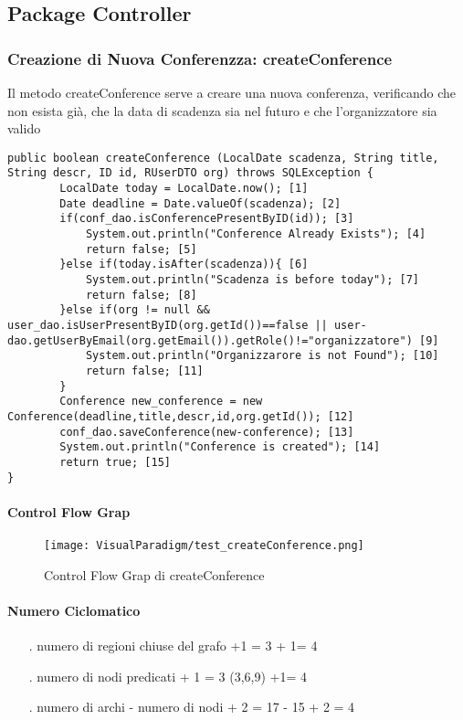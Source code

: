 \subsection{Package Controller}
\label{sec:test_strutturale_package_controller}

\subsubsection{Creazione di Nuova Conferenzza: createConference}
Il metodo createConference serve a creare una nuova conferenza, verificando che non esista già, che la data di scadenza sia nel futuro e che l'organizzatore sia valido
\begin{lstlisting}
public boolean createConference (LocalDate scadenza, String title, String descr, ID id, RUserDTO org) throws SQLException { 
        LocalDate today = LocalDate.now(); [1]
        Date deadline = Date.valueOf(scadenza); [2]
        if(conf_dao.isConferencePresentByID(id)); [3]
            System.out.println("Conference Already Exists"); [4]
            return false; [5]
        }else if(today.isAfter(scadenza)){ [6]
            System.out.println("Scadenza is before today"); [7]
            return false; [8]
        }else if(org != null && user_dao.isUserPresentByID(org.getId())==false || user-dao.getUserByEmail(org.getEmail()).getRole()!="organizzatore") [9]
            System.out.println("Organizzarore is not Found"); [10]
            return false; [11]
        }
        Conference new_conference = new Conference(deadline,title,descr,id,org.getId()); [12]
        conf_dao.saveConference(new-conference); [13]
        System.out.println("Conference is created"); [14]
        return true; [15]
}
\end{lstlisting}
\paragraph{Control Flow Grap}
\begin{figure}[ht]
  \centering
  \texttt{[image: VisualParadigm/test\_createConference.png]}
  \caption{Control Flow Grap di createConference}
  \label{fig:cfg_create_conference }
\end{figure}
\paragraph{Numero Ciclomatico}
\begin{itemize}
\item[.] numero di regioni chiuse del grafo +1 = 3 + 1= 4 
\item[.] numero di nodi predicati + 1 = 3 (3,6,9) +1= 4
\item[.] numero di archi - numero di nodi + 2 = 17 - 15 + 2 = 4 
\end{itemize}

